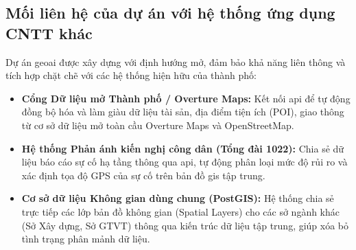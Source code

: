 \subsection{Mối liên hệ của dự án với hệ thống ứng dụng CNTT khác}
Dự án \gls{geoai} được xây dựng với định hướng mở, đảm bảo khả năng liên thông và tích hợp chặt chẽ với các hệ thống hiện hữu của thành phố:
\begin{itemize}
    \item \textbf{Cổng Dữ liệu mở Thành phố / Overture Maps:} Kết nối \gls{api} để tự động đồng bộ hóa và làm giàu dữ liệu tài sản, địa điểm tiện ích (POI), giao thông từ cơ sở dữ liệu mở toàn cầu Overture Maps và OpenStreetMap.
    \item \textbf{Hệ thống Phản ánh kiến nghị công dân (Tổng đài 1022):} Chia sẻ dữ liệu báo cáo sự cố hạ tầng thông qua \gls{api}, tự động phân loại mức độ rủi ro và xác định tọa độ GPS của sự cố trên bản đồ \gls{gis} tập trung.
    \item \textbf{Cơ sở dữ liệu Không gian dùng chung (PostGIS):} Hệ thống chia sẻ trực tiếp các lớp bản đồ không gian (Spatial Layers) cho các sở ngành khác (Sở Xây dựng, Sở GTVT) thông qua kiến trúc dữ liệu tập trung, giúp xóa bỏ tình trạng phân mảnh dữ liệu.
\end{itemize}

\cleardoublepage